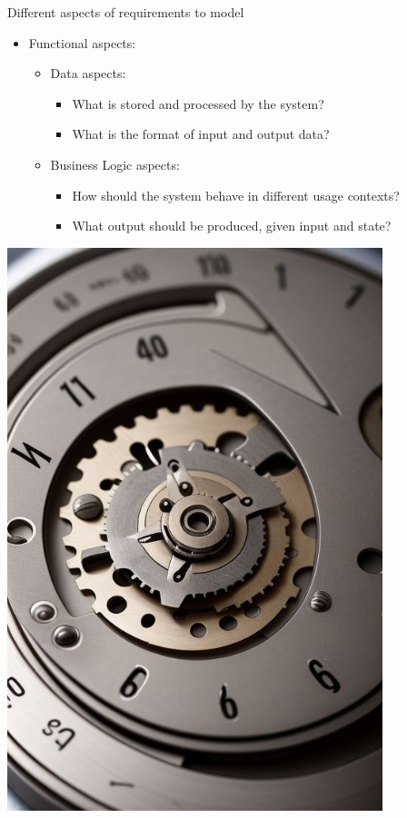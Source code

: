 
\begin{Slide}{Different aspects of requirements to model }

\begin{minipage}[t]{0.6\textwidth}
\begin{itemize}
\item Functional aspects:
\begin{itemize}
\item Data aspects:
\begin{itemize}
\item What is stored and processed by the system?
\item What is the format of input and output data?

\end{itemize}
\item Business Logic aspects: 
\begin{itemize}
\item How should the system behave in different usage contexts?
\item What output should be produced, given input and state?  
\end{itemize}
\end{itemize}
\end{itemize}
\end{minipage}%
\begin{minipage}[t]{0.4\textwidth}
\vspace{0.0em}\hfill\includegraphics[width=0.82\textwidth]{../img/cog1}
\end{minipage}%


\end{Slide}
